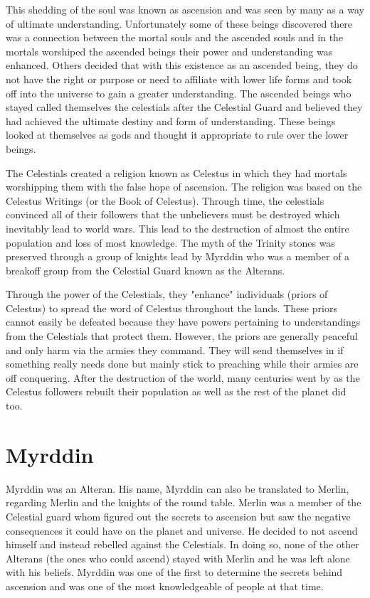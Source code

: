 This shedding of the soul was known as ascension and was seen by many as a way of ultimate understanding. Unfortunately some of these beings discovered there was a connection between the mortal souls and the ascended souls and in the mortals worshiped the ascended beings their power and understanding was enhanced. Others decided that with this existence as an ascended being, they do not have the right or purpose or need to affiliate with lower life forms and took off into the universe to gain a greater understanding. The ascended beings who stayed called themselves the celestials after the Celestial Guard and believed they had achieved the ultimate destiny and form of understanding. These beings looked at themselves as gods and thought it appropriate to rule over the lower beings.

The Celestials created a religion known as Celestus in which they had mortals worshipping them with the false hope of ascension. The religion was based on the Celestus Writings (or the Book of Celestus). Through time, the celestials convinced all of their followers that the unbelievers must be destroyed which inevitably lead to world wars. This lead to the destruction of almost the entire population and loss of most knowledge. The myth of the Trinity stones was preserved through a group of knights lead by Myrddin who was a member of a breakoff group from the Celestial Guard known as the Alterans. 

Through the power of the Celestials, they "enhance" individuals (priors of Celestus) to spread the word of Celestus throughout the lands. These priors cannot easily be defeated because they have powers pertaining to understandings from the Celestials that protect them. However, the priors are generally peaceful and only harm via the armies they command. They will send themselves in if something really needs done but mainly stick to preaching while their armies are off conquering. After the destruction of the world, many centuries went by as the Celestus followers rebuilt their population as well as the rest of the planet did too.

\section{Myrddin}

Myrddin was an Alteran. His name, Myrddin can also be translated to Merlin, regarding Merlin and the knights of the round table. Merlin was a member of the Celestial guard whom figured out the secrets to ascension but saw the negative consequences it could have on the planet and universe. He decided to not ascend himself and instead rebelled against the Celestials. In doing so, none of the other Alterans (the ones who could ascend) stayed with Merlin and he was left alone with his beliefs. Myrddin was one of the first to determine the secrets behind ascension and was one of the most knowledgeable of people at that time.

